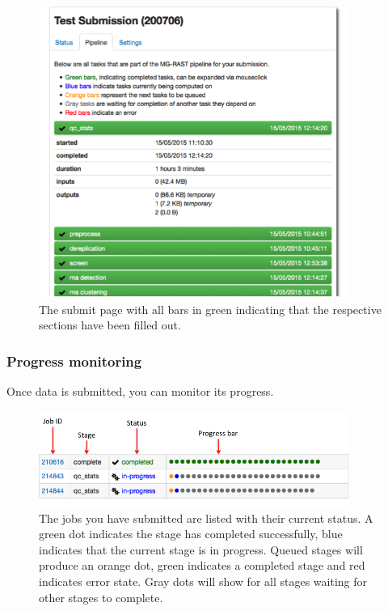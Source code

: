 \documentclass[12pt,fullpage]{report}
\begin{document}
\begin{figure}
\begin{center}
\includegraphics[width=4in]{Images/submission_done.png}
\end{center} \label{fig:submission_done}
\caption{The submit page with all bars in green indicating that the respective sections have been filled out.}
\end{figure}

\subsubsection*{Progress monitoring}
Once data is submitted, you can monitor its progress.

\begin{figure}
\begin{center}
\includegraphics[width=4in]{Images/submission_pipeline_view.png}
\end{center} \label{fig:submission_pipeline_view}
\caption{The jobs you have submitted are listed with their current status. A green dot indicates the stage has completed successfully, blue indicates that the current stage is in progress. Queued stages will produce an orange dot, green indicates a completed stage and red indicates error state. Gray dots will show for all stages waiting for other stages to complete.}
\end{figure}
\end{document}
